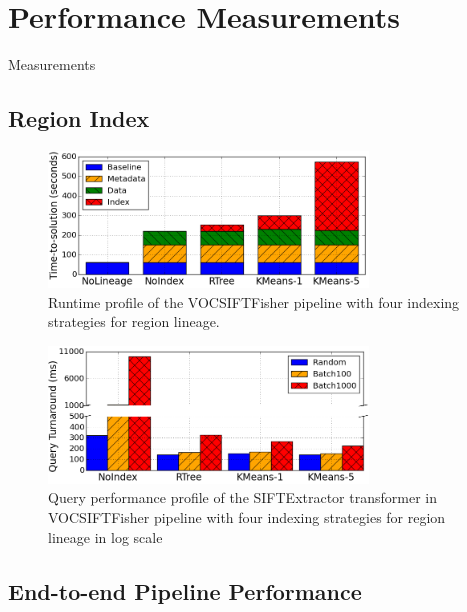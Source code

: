 \documentclass{sig-alternate}
\begin{document}
\section{Performance Measurements}
\label{sec:Perf}
Measurements

\subsection{Region Index}
\label{sec:Perf-Index}

\begin{figure}[h]
\begin{center}
    \includegraphics[width=85mm]{pictures/SIFTIndex-Time}
\caption {Runtime profile of the VOCSIFTFisher pipeline with four indexing strategies for region lineage.
    \label{fig:sift-time}
}
\end{center}
\end{figure}

\begin{figure}[h]
\begin{center}
    \includegraphics[width=85mm]{pictures/SIFTQuery-Time}
\caption {Query performance profile of the SIFTExtractor transformer in VOCSIFTFisher pipeline with four indexing strategies for region lineage in log scale
    \label{fig:sift-query}
}
\end{center}
\end{figure}

\subsection{End-to-end Pipeline Performance}
\end{document}
